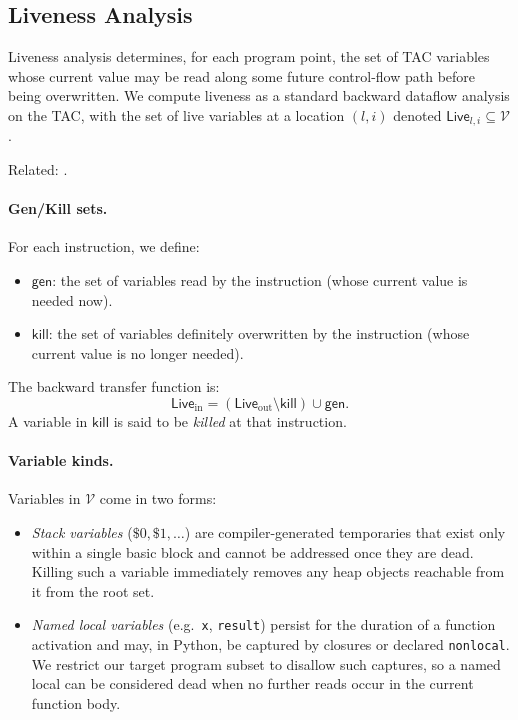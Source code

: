 \subsection{Liveness Analysis}
Liveness analysis determines, for each program point, the set of TAC variables whose current value may be read along some future control-flow path before being overwritten.  
We compute liveness as a standard backward dataflow analysis on the TAC, with the set of live variables at a location $(l,i)$ denoted $\mathsf{Live}_{l,i} \subseteq \mathcal{V}$.

Related: \cite{pythonsemantics}.

\paragraph{Gen/Kill sets.}
For each instruction, we define:
\begin{itemize}
    \item $\mathsf{gen}$: the set of variables read by the instruction (whose current value is needed now).
    \item $\mathsf{kill}$: the set of variables definitely overwritten by the instruction (whose current value is no longer needed).
\end{itemize}
The backward transfer function is:
\[
\mathsf{Live}_{\mathrm{in}} = (\mathsf{Live}_{\mathrm{out}} \setminus \mathsf{kill}) \cup \mathsf{gen}.
\]
A variable in $\mathsf{kill}$ is said to be \emph{killed} at that instruction.

\paragraph{Variable kinds.}
Variables in $\mathcal{V}$ come in two forms:
\begin{itemize}
    \item \emph{Stack variables} ($\$0, \$1, \ldots$) are compiler-generated temporaries that exist only within a single basic block and cannot be addressed once they are dead.  
          Killing such a variable immediately removes any heap objects reachable from it from the root set.
    \item \emph{Named local variables} (e.g.\ \texttt{x}, \texttt{result}) persist for the duration of a function activation and may, in Python, be captured by closures or declared \texttt{nonlocal}.
          We restrict our target program subset to disallow such captures, so a named local can be considered dead when no further reads occur in the current function body.
\end{itemize}

